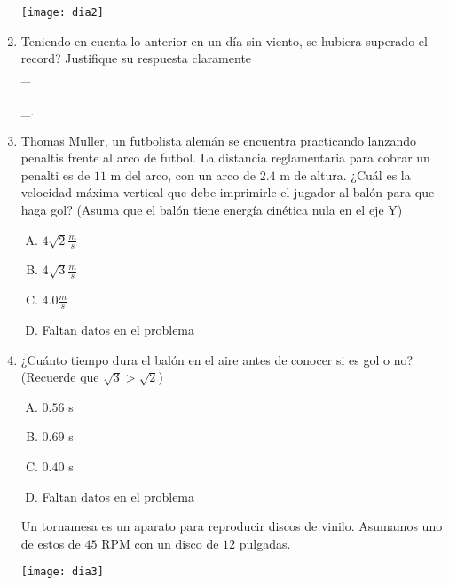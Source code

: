 \begin{enumerate}
\texttt{[image: dia2]}

\item Teniendo en cuenta lo anterior en un día sin viento, se hubiera superado el record? Justifique su respuesta claramente \label{dia-5} \hrulefill\\
\_\hrulefill\\
\_\hrulefill\\
\_\hrulefill.

\newpage
\item Thomas Muller, un futbolista alemán se encuentra practicando lanzando penaltis frente al arco de futbol. La distancia reglamentaria para cobrar un penalti es de $11$ m del arco, con un arco de $2.4$ m de altura. \label{dia-6}
\noindent ¿Cuál es la velocidad máxima vertical que debe imprimirle el jugador al balón para que haga gol? (Asuma que el balón tiene energía cinética nula en el eje Y)

\begin{enumerate}[(A)]
\item $4 \sqrt{2}\frac{m}{s}$
\item $4 \sqrt{3}\frac{m}{s}$
\item $4.0\frac{m}{s}$
\item Faltan datos en el problema
\end{enumerate}


\item ¿Cuánto tiempo dura el balón en el aire antes de conocer si es gol o no? (Recuerde que $\sqrt{3}>\sqrt{2}$) \label{dia-7}

\begin{enumerate}[(A)]
\item $0.56$ s
\item $0.69$ s
\item $0.40$ s
\item Faltan datos en el problema
\end{enumerate}

\noindent Un tornamesa es un aparato para reproducir discos de vinilo. Asumamos uno de estos de $45$ RPM con un disco de $12$ pulgadas. 

\begin{center}
\texttt{[image: dia3]}
\end{center}


\end{enumerate}

